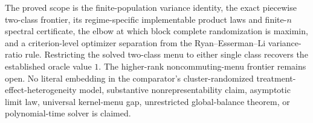 The proved scope is the finite-population variance identity, the exact piecewise two-class frontier, its regime-specific implementable product laws and finite-\(n\) spectral certificate, the elbow at which block complete randomization is maximin, and a criterion-level optimizer separation from the Ryan--Esserman--Li variance-ratio rule. Restricting the solved two-class menu to either single class recovers the established oracle value \(1\). The higher-rank noncommuting-menu frontier remains open. No literal embedding in the comparator's cluster-randomized treatment-effect-heterogeneity model, substantive nonrepresentability claim, asymptotic limit law, universal kernel-menu gap, unrestricted global-balance theorem, or polynomial-time solver is claimed.